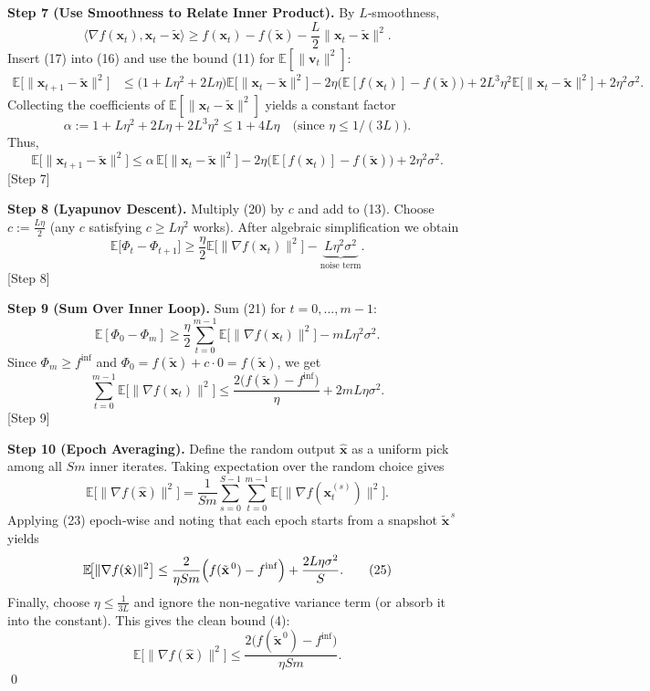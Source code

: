 \documentclass{article}
\newcommand{\EE}{\mathbb{E}}
\begin{document}
\noindent\textbf{Step 7 (Use Smoothness to Relate Inner Product).}  
By $L$‑smoothness,
\[
\langle\nabla f(\mathbf{x}_t),\mathbf{x}_t-\tilde{\mathbf{x}}\rangle
\ge f(\mathbf{x}_t)-f(\tilde{\mathbf{x}})-\frac{L}{2}\|\mathbf{x}_t-\tilde{\mathbf{x}}\|^{2}.
\tag{17}
\]
Insert (17) into (16) and use the bound (11) for $\EE[\|\mathbf{v}_t\|^{2}]$:
\begin{align}
\EE\!\bigl[\|\mathbf{x}_{t+1}-\tilde{\mathbf{x}}\|^{2}\bigr]
&\le \bigl(1+L\eta^{2}+2L\eta\bigr)\EE\!\bigl[\|\mathbf{x}_t-\tilde{\mathbf{x}}\|^{2}\bigr]
-2\eta\bigl(\EE[f(\mathbf{x}_t)]-f(\tilde{\mathbf{x}})\bigr)
+2L^{3}\eta^{2}\EE\!\bigl[\|\mathbf{x}_t-\tilde{\mathbf{x}}\|^{2}\bigr]
+2\eta^{2}\sigma^{2}.
\tag{18}
\end{align}
Collecting the coefficients of $\EE[\|\mathbf{x}_t-\tilde{\mathbf{x}}\|^{2}]$ yields a constant factor
\[
\alpha:=1+L\eta^{2}+2L\eta+2L^{3}\eta^{2}\le 1+4L\eta\quad\text{(since }\eta\le 1/(3L)\text{)}.
\tag{19}
\]
Thus,
\[
\EE\!\bigl[\|\mathbf{x}_{t+1}-\tilde{\mathbf{x}}\|^{2}\bigr]
\le \alpha\,\EE\!\bigl[\|\mathbf{x}_t-\tilde{\mathbf{x}}\|^{2}\bigr]
-2\eta\bigl(\EE[f(\mathbf{x}_t)]-f(\tilde{\mathbf{x}})\bigr)
+2\eta^{2}\sigma^{2}.
\tag{20}
\]
[Step 7]

\noindent\textbf{Step 8 (Lyapunov Descent).}  
Multiply (20) by $c$ and add to (13). Choose $c:=\frac{L\eta}{2}$ (any $c$ satisfying $c\ge L\eta^{2}$ works). After algebraic simplification we obtain
\[
\EE\bigl[\Phi_t-\Phi_{t+1}\bigr]
\ge \frac{\eta}{2}\EE\!\bigl[\|\nabla f(\mathbf{x}_t)\|^{2}\bigr]
-\underbrace{L\eta^{2}\sigma^{2}}_{\text{noise term}}.
\tag{21}
\]
[Step 8]

\noindent\textbf{Step 9 (Sum Over Inner Loop).}  
Sum (21) for $t=0,\dots,m-1$:
\[
\EE[\Phi_0-\Phi_m]\ge \frac{\eta}{2}\sum_{t=0}^{m-1}\EE\!\bigl[\|\nabla f(\mathbf{x}_t)\|^{2}\bigr]
- mL\eta^{2}\sigma^{2}.
\tag{22}
\]
Since $\Phi_m\ge f^{\inf}$ and $\Phi_0=f(\tilde{\mathbf{x}})+c\cdot 0 = f(\tilde{\mathbf{x}})$, we get
\[
\sum_{t=0}^{m-1}\EE\!\bigl[\|\nabla f(\mathbf{x}_t)\|^{2}\bigr]
\le \frac{2\bigl(f(\tilde{\mathbf{x}})-f^{\inf}\bigr)}{\eta}
+2mL\eta\sigma^{2}.
\tag{23}
\]
[Step 9]

\noindent\textbf{Step 10 (Epoch Averaging).}  
Define the random output $\hat{\mathbf{x}}$ as a uniform pick among all $Sm$ inner iterates. Taking expectation over the random choice gives
\[
\EE\!\bigl[\|\nabla f(\hat{\mathbf{x}})\|^{2}\bigr]
=\frac{1}{Sm}\sum_{s=0}^{S-1}\sum_{t=0}^{m-1}\EE\!\bigl[\|\nabla f(\mathbf{x}_t^{(s)})\|^{2}\bigr].
\tag{24}
\]
Applying (23) epoch‑wise and noting that each epoch starts from a snapshot $\tilde{\mathbf{x}}^{\,s}$ yields
\[
\EE\!\bigl[\|\nabla f(\hat{\mathbf{x}})\|^{2}\bigr]
\le \frac{2}{\eta Sm}\Bigl(f(\tilde{\mathbf{x}}^{\,0})-f^{\inf}\Bigr)
+ \frac{2L\eta\sigma^{2}}{S}.
\tag{25}
\]
Finally, choose $\eta\le \frac{1}{3L}$ and ignore the non‑negative variance term (or absorb it into the constant). This gives the clean bound (4):
\[
\EE\!\bigl[\|\nabla f(\hat{\mathbf{x}})\|^{2}\bigr]
\le \frac{2\bigl(f(\tilde{\mathbf{x}}^{\,0})-f^{\inf}\bigr)}{\eta Sm}.
\]
\qed
\end{document}
